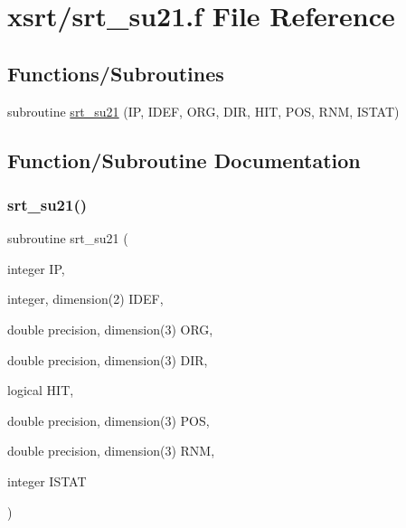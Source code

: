 \hypertarget{srt__su21_8f}{}\section{xsrt/srt\+\_\+su21.f File Reference}
\label{srt__su21_8f}
\subsection*{Functions/\+Subroutines}
\begin{DoxyCompactItemize}
\item 
subroutine \hyperlink{srt__su21_8f_a50e3a7d7f184311a285fefb075e13405}{srt\+\_\+su21} (IP, I\+D\+EF, O\+RG, D\+IR, H\+IT, P\+OS, R\+NM, I\+S\+T\+AT)
\end{DoxyCompactItemize}


\subsection{Function/\+Subroutine Documentation}
\mbox{\label{srt__su21_8f_a50e3a7d7f184311a285fefb075e13405}} 
\subsubsection{\texorpdfstring{srt\+\_\+su21()}{srt\_su21()}}
{\footnotesize\ttfamily subroutine srt\+\_\+su21 (\begin{DoxyParamCaption}\item[{integer}]{IP,  }\item[{integer, dimension(2)}]{I\+D\+EF,  }\item[{double precision, dimension(3)}]{O\+RG,  }\item[{double precision, dimension(3)}]{D\+IR,  }\item[{logical}]{H\+IT,  }\item[{double precision, dimension(3)}]{P\+OS,  }\item[{double precision, dimension(3)}]{R\+NM,  }\item[{integer}]{I\+S\+T\+AT }\end{DoxyParamCaption})}

